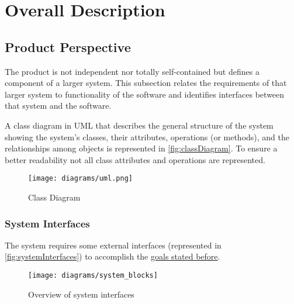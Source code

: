 \section{Overall Description}

\subsection{Product Perspective}
	
	The product is not independent nor totally self-contained but defines a component of a larger system. This subsection relates the requirements of that larger system to functionality of the software and identifies interfaces between that system and the software.
	
	A class diagram in UML that describes the general structure of the system showing the system's classes, their attributes, operations (or methods), and the relationships among objects is represented in \autoref{fig:classDiagram}. To ensure a better readability not all class attributes and operations are represented. \newline \newline
		
	\begin{figure}[h]
			\centering
			\texttt{[image: diagrams/uml.png]}
			\caption{
				\label{fig:classDiagram} 
				Class Diagram
			}
		\end{figure}

	\subsubsection{System Interfaces}
	\label{sec:systemInterfaces}
		The system requires some external interfaces (represented in \autoref{fig:systemInterfaces}) to accomplish the \hyperref[sec:goals]{goals stated before}. \newline \newline
		\begin{figure}[h]
			\centering
			\texttt{[image: diagrams/system\_blocks]}
			\caption{
				\label{fig:systemInterfaces} 
				Overview of system interfaces
			}
		\end{figure} 
\clearpage			
